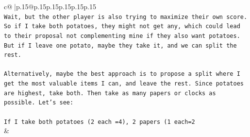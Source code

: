 \documentclass{article}
\begin{document}
{\begin{supertabular}{c@{$\;$}|p{.15\linewidth}@{}p{.15\linewidth}p{.15\linewidth}p{.15\linewidth}p{.15\linewidth}p{.15\linewidth}}
{{{\\ 
\texttt{Wait, but the other player is also trying to maximize their own score. So if I take both potatoes, they might not get any, which could lead to their proposal not complementing mine if they also want potatoes. But if I leave one potato, maybe they take it, and we can split the rest.} \\
\\ 
\texttt{Alternatively, maybe the best approach is to propose a split where I get the most valuable items I can, and leave the rest. Since potatoes are highest, take both. Then take as many papers or clocks as possible. Let's see:} \\
\\ 
\texttt{If I take both potatoes (2 each =4), 2 papers (1 each=2} \\
            }
        }
    }
    & \\ \\


\end{supertabular}}
\end{document}
